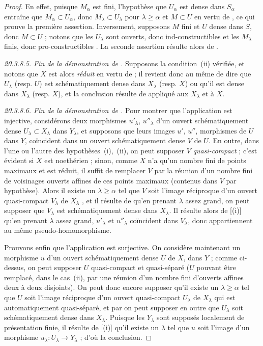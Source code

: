 \begin{proof}
En effet, puisque $M_\alpha$ est fini, l'hypothèse que $U_\alpha$ est dense dans $S_\alpha$ entraîne que
$M_\alpha\subset U_\alpha$, donc $M_\lambda\subset U_\lambda$ pour $\lambda\geq\alpha$ et $M\subset U$ en vertu de , ce qui prouve la première assertion.
Inversement, supposons $M$ fini et $U$ dense dans $S$, donc $M\subset U$ ; notons que les $U_\lambda$ sont ouverts, donc ind-constructibles et les $M_\lambda$ finis, donc pro-constructibles .
La seconde assertion résulte alors de .

\label{IV.20.3.8.5}
\emph{20.3.8.5. Fin de la démonstration de .}
Supposons la condition~(ii) vérifiée, et notons que $X$ est alors \emph{réduit} en vertu de  ; il revient donc au même de dire que $U_\lambda$ (resp. $U$) est schématiquement dense dans $X_\lambda$ (resp. $X$) ou qu'il est dense dans $X_\lambda$ (resp. $X$), et la conclusion résulte de  appliqué aux $X_\lambda$ et à $X$.

\label{IV.20.3.8.6}
\emph{20.3.8.6. Fin de la démonstration de .}
Pour montrer que l'application  est injective, considérons deux morphismes $u'_\lambda$, $u''_\lambda$ d'un ouvert schématiquement dense $U_\lambda\subset X_\lambda$ dans $Y_\lambda$, et supposons que leurs images $u'$, $u''$, morphismes de $U$ dans $Y$, coïncident dans un ouvert schématiquement dense $V$ de $U$.
En outre, dans l'une ou l'autre des hypothèses~(i),~(ii), on peut supposer $V$ \emph{quasi-compact} ; c'est évident si $X$ est noethérien ; sinon, comme $X$ n'a qu'un nombre fini de points maximaux et est réduit, il suffit de remplacer $V$ par la réunion d'un nombre fini de voisinages ouverts affines de ces points maximaux (contenus dans $V$ par hypothèse).
Alors il existe un $\lambda\geq\alpha$ tel que $V$ soit l'image réciproque d'un ouvert quasi-compact $V_\lambda$ de $X_\lambda$ , et il résulte de  qu'en prenant $\lambda$ assez grand, on peut supposer que $V_\lambda$ est schématiquement dense dans $X_\lambda$.
Il résulte alors de [(i)] qu'en prenant $\lambda$ assez grand, $u'_\lambda$ et $u''_\lambda$ coïncident dans $V_\lambda$, donc appartiennent au même pseudo-homomorphisme.

Prouvons enfin que l'application  est surjective.
On considère maintenant un morphisme $u$ d'un ouvert schématiquement dense $U$ de $X$, dans $Y$ ; comme ci-dessus, on peut supposer $U$ quasi-compact et quasi-séparé ($U$ pouvant être remplacé, dans le cas~(ii), par une réunion d'un nombre fini d'ouverts affines deux à deux disjoints).
On peut donc encore supposer qu'il existe un $\lambda\geq\alpha$ tel que $U$ soit l'image réciproque d'un ouvert quasi-compact $U_\lambda$ de $X_\lambda$  qui est automatiquement quasi-séparé, et par  on peut supposer en outre que $U_\lambda$ soit schématiquement dense dans $X_\lambda$.
Puisque les $Y_\lambda$ sont supposés localement de présentation finie, il résulte de [(i)] qu'il existe un $\lambda$ tel que $u$ soit l'image d'un morphisme $u_\lambda:U_\lambda\to Y_\lambda$ ; d'où la conclusion.


\end{proof}
